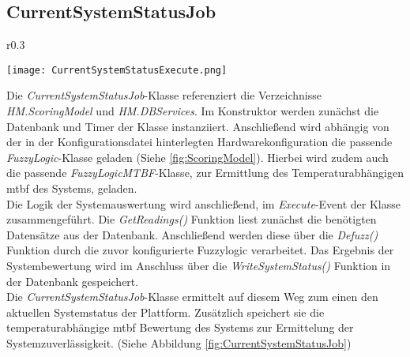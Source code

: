 \subsection{CurrentSystemStatusJob}
\begin{wrapfigure}{r}{0.3\textwidth}
    \vspace{-1.2cm}
    \begin{center}
      \texttt{[image: CurrentSystemStatusExecute.png]}
    \end{center}
    \vspace{-0.5cm}
    \caption{Ablaufdiagram des Execute Events der \textit{CurrentSystemStatusJob}-Klasse}
    \label{fig:CurrentSystemStatusJob}
  \end{wrapfigure}
Die \textit{CurrentSystemStatusJob}-Klasse referenziert die Verzeichnisse \textit{HM.ScoringModel} und \textit{HM.DBServices}. Im Konstruktor werden zunächst die Datenbank und Timer der Klasse instanziiert. Anschließend wird abhängig von der in der Konfigurationsdatei hinterlegten Hardwarekonfiguration die passende \textit{FuzzyLogic}-Klasse geladen (Siehe \ref{fig:ScoringModel}). Hierbei wird zudem auch die passende \textit{FuzzyLogicMTBF}-Klasse, zur Ermittlung des Temperaturabhängigen \ac{mtbf} des Systems, geladen.\\
Die Logik der Systemauswertung wird anschließend, im \textit{Execute}-Event der Klasse zusammengeführt. Die \textit{GetReadings()} Funktion liest zunächst die benötigten Datensätze aus der Datenbank. Anschließend werden diese über die \textit{Defuzz()} Funktion durch die zuvor konfigurierte Fuzzylogic verarbeitet. Das Ergebnis der Systembewertung wird im Anschluss über die \textit{WriteSystemStatus()} Funktion in der Datenbank gespeichert.\\
Die \textit{CurrentSystemStatusJob}-Klasse ermittelt auf diesem Weg zum einen den aktuellen Systemstatus der Plattform. Zusätzlich speichert sie die temperaturabhängige \ac{mtbf} Bewertung des Systems zur Ermittelung der Systemzuverlässigkeit. (Siehe Abbildung \ref{fig:CurrentSystemStatusJob})   

